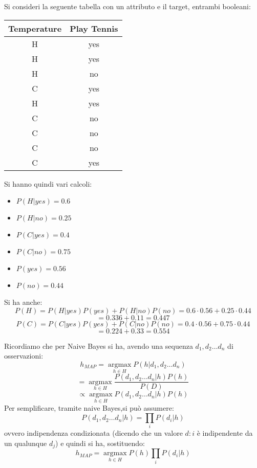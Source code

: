\begin{esercizio}
  Si consideri la seguente tabella con un attributo e il target, entrambi
  booleani:
  \begin{table}[H]
    \centering
    \begin{tabular}{c||c}
      Temperature & Play Tennis\\
      \hline
      \hline
      H & yes\\
      H & yes\\
      H & no\\
      C & yes\\
      H & yes\\
      C & no\\
      C & no\\
      C & no\\
      C & yes\\
    \end{tabular}
  \end{table}
  Si hanno quindi vari calcoli:
  \begin{itemize}
    \item $P(H|yes)=0.6$
    \item $P(H|no)=0.25$
    \item $P(C|yes)=0.4$
    \item $P(C|no)=0.75$
    \item $P(yes)=0.56$
    \item $P(no)=0.44$
  \end{itemize}
  Si ha anche:
  \[P(H)=P(H|yes)P(yes)+P(H|no)P(no)=0.6\cdot 0.56+0.25\cdot 0.44 \]
  \[= 0.336+0.11=0.447\]
  \[P(C)=P(C|yes)P(yes)+P(C|no)P(no)=0.4\cdot 0.56+0.75\cdot 0.44 \]
  \[= 0.224+0.33=0.554\]
\end{esercizio}
Ricordiamo che per Naive Bayes si ha, avendo una sequenza $d_1,d_2\ldots d_n$ di
osservazioni: 
\[h_{MAP}=\operatorname*{argmax}_{h\in H}P(h|d_1,d_2\ldots d_n)\]
\[=\operatorname*{argmax}_{h\in H}\frac{P(d_1,d_2\ldots d_n|h)P(h)}{P(D)}\]
\[\varpropto\operatorname*{argmax}_{h\in H}P(d_1,d_2\ldots d_n|h)P(h)\]
Per semplificare, tramite naive Bayes,si può assumere:
\[P(d_1,d_2\ldots d_n|h)=\prod_iP(d_i|h)\]
ovvero indipendenza condizionata (dicendo che un valore $d:i$ è indipendente da
un qualunque $d_j$) e quindi si ha, sostituendo:
\[h_{MAP}=\operatorname*{argmax}_{h\in H}P(h)\prod_iP(d_i|h)\]
\newpage
